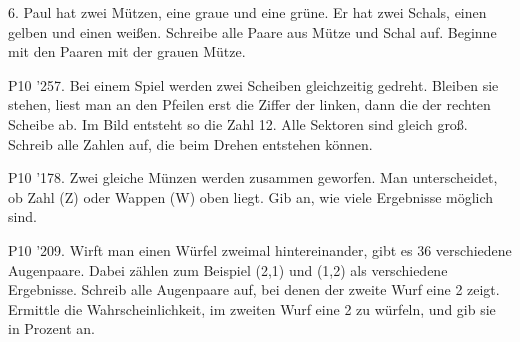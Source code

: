 \documentclass[11pt]{article}
\begin{document}
\pfgruppe{}
\begin{pfaufg}{}{6.}{}
Paul hat zwei Mützen, eine graue und eine grüne. Er hat zwei Schals, einen gelben und einen weißen. Schreibe alle Paare aus Mütze und Schal auf. Beginne mit den Paaren mit der grauen Mütze.
\end{pfaufg}
\pfgruppe{}
\begin{pfaufg}{P10 ’25}{7.}{}
Bei einem Spiel werden zwei Scheiben gleichzeitig gedreht. Bleiben sie stehen, liest man an den Pfeilen erst die Ziffer der linken, dann die der rechten Scheibe ab. Im Bild entsteht so die Zahl 12. Alle Sektoren sind gleich groß. Schreib alle Zahlen auf, die beim Drehen entstehen können.
\par\smallskip\noindent {}\hspace{1.2cm}\par
{}
\end{pfaufg}
\pfgruppe{}
\begin{pfaufg}{P10 ’17}{8.}{}
Zwei gleiche Münzen werden zusammen geworfen. Man unterscheidet, ob Zahl (Z) oder Wappen (W) oben liegt. Gib an, wie viele Ergebnisse möglich sind.
\end{pfaufg}
\pfgruppe{}
\begin{pfaufg}{P10 ’20}{9.}{}
Wirft man einen Würfel zweimal hintereinander, gibt es 36 verschiedene Augenpaare. Dabei zählen zum Beispiel (2,1) und (1,2) als verschiedene Ergebnisse. Schreib alle Augenpaare auf, bei denen der zweite Wurf eine 2 zeigt. Ermittle die Wahrscheinlichkeit, im zweiten Wurf eine 2 zu würfeln, und gib sie in Prozent an.
\end{pfaufg}
\end{document}
